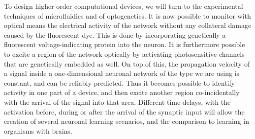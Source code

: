 To design higher order computational devices, we will turn to the experimental techniques of microfluidics and of optogenetics. 
It is now possible to monitor with optical means the electrical activity of the network without any collateral damage caused by the fluorescent dye. This is done by incorporating genetically a fluorescent voltage-indicating protein into the neuron. It is furthermore possible to excite a region of the network optically by activating photosensitive channels that are genetically embedded as well. On top of this, the propagation velocity of a signal inside a one-dimensional neuronal network of the type we are using is constant, and can be reliably predicted. Thus it becomes possible to identify activity in one part of a device, and then excite another region co-incidentally with the arrival of the signal into that area. Different time delays, with the activation before, during or after the arrival of the synaptic input will allow the creation of several neuronal learning scenarios, and the comparison to learning in organisms with brains.

